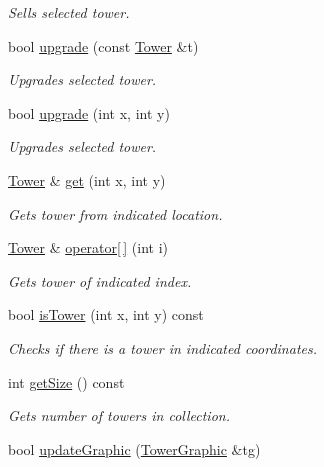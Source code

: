 \begin{DoxyCompactItemize}
\begin{DoxyCompactList}\small\item\em Sells selected tower. \end{DoxyCompactList}\item 
bool \mbox{\hyperlink{class_tower_manager_aec10d63aa3de906706738c04fceb0ff7}{upgrade}} (const \mbox{\hyperlink{class_tower}{Tower}} \&t)
\begin{DoxyCompactList}\small\item\em Upgrades selected tower. \end{DoxyCompactList}\item 
bool \mbox{\hyperlink{class_tower_manager_a08071e4d7230bd316577086f787fffeb}{upgrade}} (int x, int y)
\begin{DoxyCompactList}\small\item\em Upgrades selected tower. \end{DoxyCompactList}\item 
\mbox{\hyperlink{class_tower}{Tower}} \& \mbox{\hyperlink{class_tower_manager_a05e8e2670b1b58f3d4f9851f431f08bc}{get}} (int x, int y)
\begin{DoxyCompactList}\small\item\em Gets tower from indicated location. \end{DoxyCompactList}\item 
\mbox{\hyperlink{class_tower}{Tower}} \& \mbox{\hyperlink{class_tower_manager_ad96e7abf6a9d512af64a86d7f44bf1a5}{operator\mbox{[}$\,$\mbox{]}}} (int i)
\begin{DoxyCompactList}\small\item\em Gets tower of indicated index. \end{DoxyCompactList}\item 
bool \mbox{\hyperlink{class_tower_manager_ab4943b63a4d5646ae6a951108732f4f6}{is\+Tower}} (int x, int y) const
\begin{DoxyCompactList}\small\item\em Checks if there is a tower in indicated coordinates. \end{DoxyCompactList}\item 
int \mbox{\hyperlink{class_tower_manager_a78683aa19991978f304fbea0b8e25890}{get\+Size}} () const
\begin{DoxyCompactList}\small\item\em Gets number of towers in collection. \end{DoxyCompactList}\item 
bool \mbox{\hyperlink{class_tower_manager_ad421cee3c30020aa02e770823dd1dab6}{update\+Graphic}} (\mbox{\hyperlink{class_tower_graphic}{Tower\+Graphic}} \&tg)

\end{DoxyCompactItemize}
